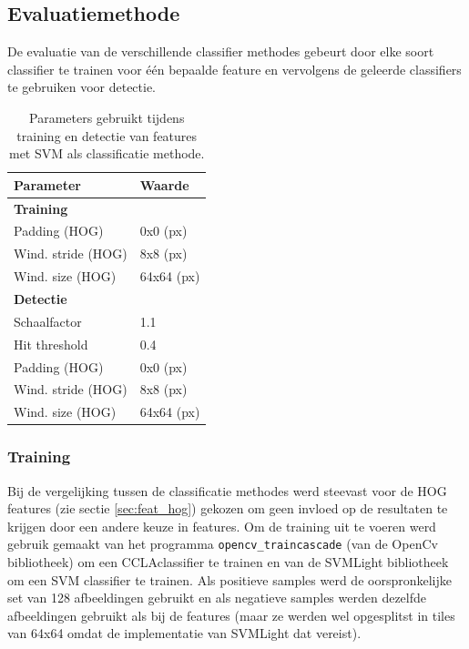 \subsection{Evaluatiemethode} \label{sec:eval_class}
De evaluatie van de verschillende classifier methodes gebeurt door elke soort classifier te trainen voor \'e\'en bepaalde feature en vervolgens de geleerde classifiers te gebruiken voor detectie. 

\begin{table}
	\centering
  	\begin{tabular}{@{}ll@{}} \toprule
    Parameter & Waarde\\ \midrule
    \textbf{Training} & \\ 
    Padding (HOG) & 0x0 (px) \\
    Wind. stride (HOG) & 8x8 (px) \\
    Wind. size (HOG) & 64x64 (px) \\ \midrule
    \textbf{Detectie} & \\ %
	Schaalfactor & 1.1 \\
	Hit threshold & 0.4 \\
    Padding (HOG) & 0x0 (px) \\
    Wind. stride (HOG) & 8x8 (px) \\
    Wind. size (HOG) & 64x64 (px) \\ \bottomrule
  \end{tabular}
  \caption{Parameters gebruikt tijdens training en detectie van features met SVM als classificatie methode.}
  \label{tab:param_svm}
\end{table}

\subsubsection*{Training}

Bij de vergelijking tussen de classificatie methodes werd steevast voor de HOG features (zie sectie \ref{sec:feat_hog}) gekozen om geen invloed op de resultaten te krijgen door een andere keuze in features. Om de training uit te voeren werd gebruik gemaakt van het programma \texttt{opencv\_traincascade} (van de OpenCv bibliotheek) om een CCLAclassifier te trainen en van de SVMLight bibliotheek~\cite{joachims1999svmlight} om een SVM classifier te trainen. Als positieve samples werd de oorspronkelijke set van 128 afbeeldingen gebruikt en als negatieve samples werden dezelfde afbeeldingen gebruikt als bij de features (maar ze werden wel opgesplitst in tiles van 64x64 omdat de implementatie van SVMLight dat vereist).

